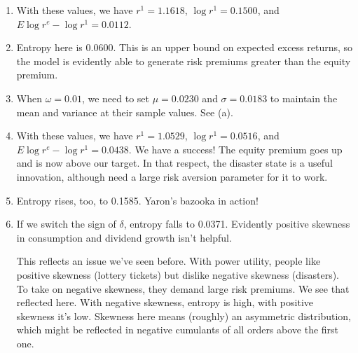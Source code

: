 \documentclass[11pt]{article}
\begin{document}
\begin{enumerate}
\begin{enumerate}
\item With these values, we have
$r^1 = 1.1618$, $\log r^1 = 0.1500$, and
$E \log r^e - \log r^1 = 0.0112 $.

\item Entropy here is 0.0600.
This is an upper bound on expected excess returns,
so the model is evidently able to generate risk premiums greater than the equity premium.

\item When $\omega = 0.01$,
we need to set $\mu = 0.0230$ and $\sigma = 0.0183$ to maintain the mean and
variance at their sample values.
See (a).

\item With these values, we have
$r^1 = 1.0529$, $\log r^1 = 0.0516$, and
$E \log r^e - \log r^1 = 0.0438 $.
We have a success!
The equity premium goes up and is now above our target.
In that respect, the disaster state is a useful innovation,
although need a large risk aversion parameter for it to work.

\item Entropy rises, too, to 0.1585.  Yaron's bazooka in action!

\item If we switch the sign of $\delta$,
entropy falls to 0.0371.
Evidently positive skewness in consumption and dividend growth
isn't helpful.

This reflects an issue we've seen before.  With power utility,
people like positive skewness (lottery tickets)
but dislike negative skewness (disasters).
To take on negative skewness, they demand large risk premiums.
We see that reflected here.
With negative skewness, entropy is high, with positive skewness
it's low.
Skewness here means (roughly) an asymmetric distribution,
which might be reflected in negative cumulants of all orders above the first one.
\end{enumerate}

\end{enumerate}
\end{document}
